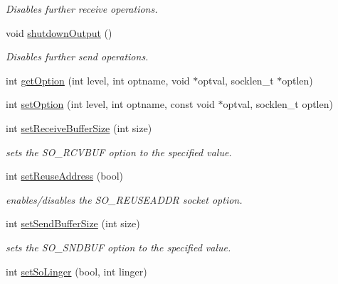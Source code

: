 \begin{DoxyCompactItemize}
\begin{DoxyCompactList}\small\item\em Disables further receive operations. \end{DoxyCompactList}\item 
\hypertarget{classSocket_a650128aee2581e6695c6812d8afe14b5}{void \hyperlink{classSocket_a650128aee2581e6695c6812d8afe14b5}{shutdown\-Output} ()}\label{classSocket_a650128aee2581e6695c6812d8afe14b5}

\begin{DoxyCompactList}\small\item\em Disables further send operations. \end{DoxyCompactList}\item 
int \hyperlink{classSocket_adc250da2f4f1e813850b83cc0be04fa2}{get\-Option} (int level, int optname, void $\ast$optval, socklen\-\_\-t $\ast$optlen)
\item 
int \hyperlink{classSocket_aede9a4b4ef00a7169f8eec1e75f1796d}{set\-Option} (int level, int optname, const void $\ast$optval, socklen\-\_\-t optlen)
\item 
\hypertarget{classSocket_a06ff0dd6837c9f51948df655fc2713cd}{int \hyperlink{classSocket_a06ff0dd6837c9f51948df655fc2713cd}{set\-Receive\-Buffer\-Size} (int size)}\label{classSocket_a06ff0dd6837c9f51948df655fc2713cd}

\begin{DoxyCompactList}\small\item\em sets the S\-O\-\_\-\-R\-C\-V\-B\-U\-F option to the specified value. \end{DoxyCompactList}\item 
\hypertarget{classSocket_ab02b997fa7e251d596116e95c9ccaf97}{int \hyperlink{classSocket_ab02b997fa7e251d596116e95c9ccaf97}{set\-Reuse\-Address} (bool)}\label{classSocket_ab02b997fa7e251d596116e95c9ccaf97}

\begin{DoxyCompactList}\small\item\em enables/disables the S\-O\-\_\-\-R\-E\-U\-S\-E\-A\-D\-D\-R socket option. \end{DoxyCompactList}\item 
\hypertarget{classSocket_afc49ad6cc259a0006ca13bb22fdd7383}{int \hyperlink{classSocket_afc49ad6cc259a0006ca13bb22fdd7383}{set\-Send\-Buffer\-Size} (int size)}\label{classSocket_afc49ad6cc259a0006ca13bb22fdd7383}

\begin{DoxyCompactList}\small\item\em sets the S\-O\-\_\-\-S\-N\-D\-B\-U\-F option to the specified value. \end{DoxyCompactList}\item 
\hypertarget{classSocket_a41cc1caae51e3e83e16ce2c20689ed03}{int \hyperlink{classSocket_a41cc1caae51e3e83e16ce2c20689ed03}{set\-So\-Linger} (bool, int linger)}\label{classSocket_a41cc1caae51e3e83e16ce2c20689ed03}


\end{DoxyCompactItemize}
